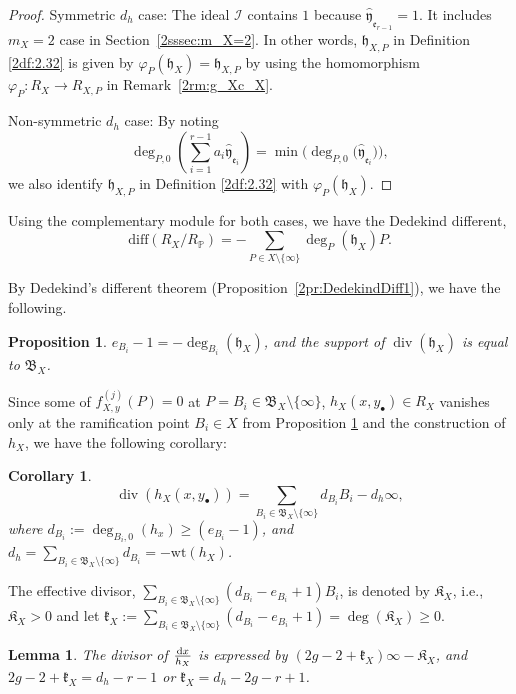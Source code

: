 \documentclass[10pt,a4paper]{amsart}
\def\PP{{\mathbb P}}
\def\cI{{\mathcal I}}
\def\fB{{\mathfrak B}}
\def\fK{{\mathfrak K}}
\def\fe{{\mathfrak e}}
\def\fh{{\mathfrak h}}
\def\fk{{\mathfrak k}}
\def\hfy{{\widehat{\mathfrak y}}}
\def\diff{\mathrm{diff}}
\def\Div{\operatorname{div}}
\def\wt{{\mathrm {wt}}}
\numberwithin{equation}{section}
\newtheorem{Corollary}[Theorem]{Corollary}
\newtheorem{Lemma}[Theorem]{Lemma}
\newtheorem{Proposition}[Theorem]{Proposition}
 { \theoremstyle{definition}
\newtheorem{Definition}[Theorem]{Definition}
\newtheorem{Note}[Theorem]{Note}
\newtheorem{Example}[Theorem]{Example}
\newtheorem{Remark}[Theorem]{Remark} }
\begin{document}
\begin{proof}
Symmetric $d_h$ case: The ideal $\cI$ contains $1$ because $\hfy_{\fe_{r-1}}=1$.
It includes $m_X=2$ case in Section~\ref{2sssec:m_X=2}.
In other words, $\fh_{X,P}$ in Definition \ref{2df:2.32} is given by $\varphi_P(\fh_X)=\fh_{X,P}$ by using the homomorphism $\varphi_P\colon R_X \to R_{X,P}$ in Remark~\ref{2rm:g_Xc_X}.

Non-symmetric $d_h$ case:
By noting
\[
\deg_{P,0}\left(\sum_{i=1}^{r-1}a_i \hfy_{\fe_i}\right)=
\min\big(\deg_{P,0}\big( \hfy_{\fe_i}\big)\big),
\]
we also identify $\fh_{X,P}$ in Definition \ref{2df:2.32} with $\varphi_P(\fh_X)$.
\end{proof}

Using the complementary module for both cases, we have the Dedekind different,
\[
\diff(R_X/R_\PP)=-
\sum_{P\in X\setminus\{\infty\}}
\deg_P(\fh_{X}) P.
\]

By Dedekind's different theorem (Proposition~\ref{2pr:DedekindDiff1}), we have the following.
\begin{Proposition}\label{2pr:DedekindDiff30}
$e_{B_i}-1=-\deg_{B_i}(\fh_X)$, and the support of $\Div(\fh_X)$ is equal to $\fB_X$.
\end{Proposition}

Since some of $f_{X,y}^{(j)}(P)=0$ at $P=B_i \in \fB_X\setminus\{\infty\}$, $h_X(x, y_\bullet)\in R_X$ vanishes only at the ramification point $B_i\in X$ from Proposition \ref{2pr:DedekindDiff30} and the construction of $h_X$, we have the following corollary:

\begin{Corollary}\label{2cr:h_X}
\[
\Div(h_X(x,y_\bullet)) =
\sum_{B_i\in \fB_X\setminus\{\infty\}}d_{B_
i} B_i
-d_h\infty,
\]
where $d_{B_i}:=\deg_{B_i,0}(h_x) \ge (e_{B_i}-1)$, and $d_h = \sum_{B_i\in \fB_X\setminus\{\infty\}}d_{B_i}=-\wt (h_X)$.
\end{Corollary}

\begin{Definition}\label{2df:fKX_fkX}
The effective divisor, $\sum_{B_i\in \fB_X\setminus\{\infty\}}(d_{B_i}-e_{B_i}+1)B_i$, is denoted by
$\fK_X$, i.e., $\fK_X>0$ and let
$\fk_X:=\sum_{B_i\in \fB_X\setminus\{\infty\}}(d_{B_i}-e_{B_i}+1)=\deg(\fK_X)\ge0$.
\end{Definition}

\begin{Lemma}\label{2lm:dx_hX}
The divisor of $\frac{{\rm d} x}{h_X}$ is expressed by $(2g-2+\fk_X)\infty-\fK_X$, and $2g-2+\fk_X=d_h - r- 1$ or $\fk_X=d_h - 2g- r+1$.
\end{Lemma}
\end{document}
